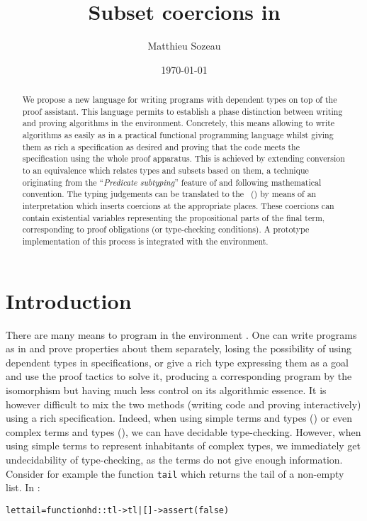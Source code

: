\documentclass{llncs}
\author{Matthieu Sozeau}
\institute{LRI, Paris Sud XI University\\\email{sozeau@lri.fr}}
\title{Subset coercions in \Coq} %
\date{\today}
\newenvironment{code}{\begin{alltt}}{\end{alltt}}
\def\id#1{\texttt{#1}}
\begin{document}
\maketitle

\begin{abstract}
  We propose a new language for writing programs with dependent
  types on top of the \Coq proof assistant. This language permits
  to establish a phase distinction between writing and proving
  algorithms in the \Coq{} environment.  Concretely, this means allowing
  to write algorithms as easily as in a practical functional programming
  language whilst giving them as rich a specification as desired and
  proving that the code meets the specification using the whole \Coq{}
  proof apparatus. This is achieved by extending conversion to an
  equivalence which relates types and subsets based on them, a technique
  originating from the ``\emph{Predicate subtyping}'' feature of \PVS{}
  and following mathematical convention. The typing judgements can be
  translated to the \CICfull~(\CIC{}) by means of an interpretation
  which inserts coercions at the appropriate places. These coercions can
  contain existential variables representing the propositional parts of
  the final term, corresponding to proof obligations (or \PVS{}
  type-checking conditions). A prototype implementation of this process
  is integrated with the \Coq{} environment.
\end{abstract}

\section{Introduction}
There are many means to program in the \Coq{} environment \cite{CoqArt}. One
can write programs as in \ML{} and prove properties about them
separately, losing the possibility of using dependent types in
specifications, or give a rich type expressing them as a goal and use the
proof tactics to solve it, producing a corresponding program by the
\CurryHoward isomorphism but having much less control on its algorithmic
essence. It is however difficult to mix the two methods
(writing code and proving interactively) using a rich specification. 
Indeed, when using simple terms and types (\ML{}) or even complex terms and
types (\Coq{}), we can have decidable type-checking. However, when using
simple terms to represent inhabitants of complex types, we immediately get
undecidability of type-checking, as the terms do not give enough
information. Consider for example the function \id{tail} which returns
the tail of a non-empty list. In \ML{}:
\begin{code}
  let tail = function hd :: tl -> tl | [] -> assert(false)
\end{code}
\end{document}
